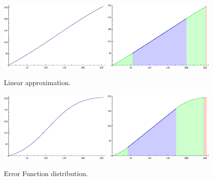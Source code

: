 \documentclass[10pt,a4paper]{article}
\begin{document}
\begin{figure}[h!]
  \caption{Linear approximation.}
  \label{fig:Linear}
  \centering
    \includegraphics[width=0.49\textwidth]{linearSmooth.eps}
    \includegraphics[width=0.49\textwidth]{linearColor.eps}
\end{figure}

\begin{figure}[h!]
  \caption{Error Function distribution.}
  \label{fig:ERF}
  \centering
    \includegraphics[width=0.49\textwidth]{ERFSmooth.eps}
    \includegraphics[width=0.49\textwidth]{ERFColor.eps}
\end{figure}
\end{document}
